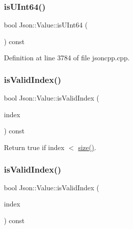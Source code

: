 \subsubsection{\texorpdfstring{is\+U\+Int64()}{isUInt64()}\hspace{0.1cm}{\footnotesize\ttfamily [2/2]}}
{\footnotesize\ttfamily bool Json\+::\+Value\+::is\+U\+Int64 (\begin{DoxyParamCaption}{ }\end{DoxyParamCaption}) const}



Definition at line 3784 of file jsoncpp.\+cpp.

\hypertarget{class_json_1_1_value_ac2928f174a6e081c1500c28c2d61ee93}{}\label{class_json_1_1_value_ac2928f174a6e081c1500c28c2d61ee93} 
\subsubsection{\texorpdfstring{is\+Valid\+Index()}{isValidIndex()}\hspace{0.1cm}{\footnotesize\ttfamily [1/2]}}
{\footnotesize\ttfamily bool Json\+::\+Value\+::is\+Valid\+Index (\begin{DoxyParamCaption}\item[{\hyperlink{class_json_1_1_value_a184a91566cccca7b819240f0d5561c7d}{Array\+Index}}]{index }\end{DoxyParamCaption}) const}



Return true if index $<$ \hyperlink{class_json_1_1_value_a0ec2808e1d7efa4e9fad938d6667be44}{size()}. 

\hypertarget{class_json_1_1_value_ac2928f174a6e081c1500c28c2d61ee93}{}\label{class_json_1_1_value_ac2928f174a6e081c1500c28c2d61ee93} 
\subsubsection{\texorpdfstring{is\+Valid\+Index()}{isValidIndex()}\hspace{0.1cm}{\footnotesize\ttfamily [2/2]}}
{\footnotesize\ttfamily bool Json\+::\+Value\+::is\+Valid\+Index (\begin{DoxyParamCaption}\item[{\hyperlink{class_json_1_1_value_a184a91566cccca7b819240f0d5561c7d}{Array\+Index}}]{index }\end{DoxyParamCaption}) const}



